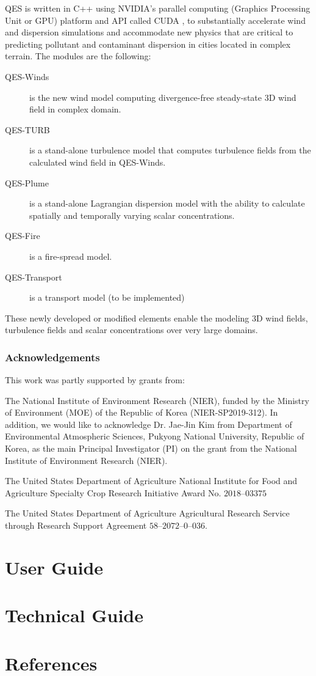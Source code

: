 \documentclass[14pt]{report}
\begin{document}
QES is written in C++ using NVIDIA's parallel computing (Graphics Processing Unit or GPU) platform and API called CUDA \cite{nvidia2019cuda}, to substantially accelerate wind and dispersion simulations and accommodate new physics that are critical to predicting pollutant and contaminant dispersion in cities located in complex terrain. The modules are the following: 
\begin{description}
\item[QES-Winds] is the new wind model computing divergence-free steady-state 3D wind field in complex domain. 
\item[QES-TURB] is a stand-alone turbulence model that computes turbulence fields from the calculated wind field in QES-Winds.
\item[QES-Plume] is a stand-alone Lagrangian dispersion model with the ability to calculate spatially and temporally varying scalar concentrations.
\item[QES-Fire] is a fire-spread model.
\item[QES-Transport] is a transport model (to be implemented)
\end{description}


These newly developed or modified elements enable the modeling 3D wind fields, turbulence fields and scalar concentrations over very large domains.




\section{Acknowledgements}
This work was partly supported by grants from:
\begin{description}\setlength\itemsep{0em}
\item[] The National Institute of Environment Research (NIER), funded by the Ministry of Environment (MOE) of the Republic of Korea (NIER-SP2019-312). In addition, we would like to acknowledge Dr. Jae-Jin Kim from Department of Environmental Atmospheric Sciences, Pukyong National University, Republic of Korea, as the main Principal Investigator (PI) on the grant from the National Institute of Environment Research (NIER). 
\item[] The United States Department of Agriculture National Institute for Food and Agriculture Specialty Crop Research Initiative Award No. $2018\mbox{--}03375$
\item[] The United States Department of Agriculture Agricultural Research Service through Research Support Agreement $58\mbox{--}2072\mbox{--}0\mbox{--}036$. 
\end{description}

\part{User Guide}



\part{Technical Guide}




\part{References}




\end{document}
